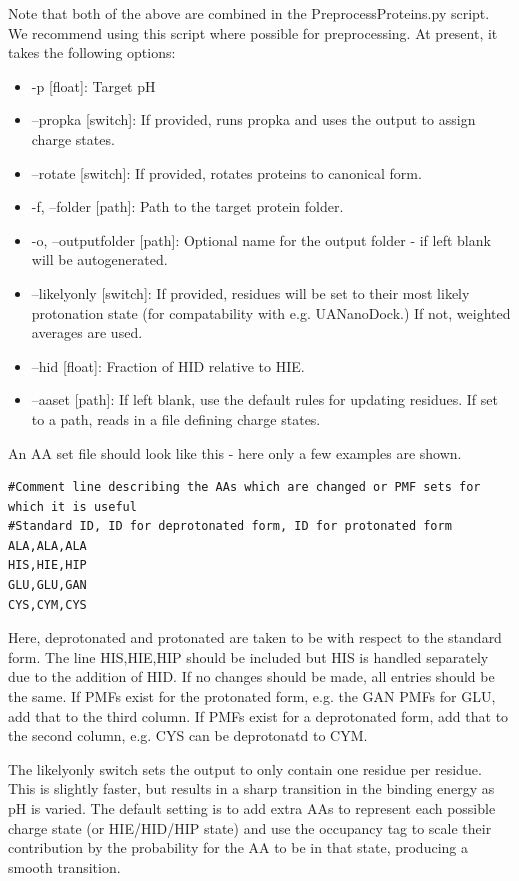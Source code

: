 \documentclass[10pt,a4paper,onecolumn]{report}
\begin{document}
Note that both of the above are combined in the PreprocessProteins.py script. We recommend using this script where possible for preprocessing. At present, it takes the following options:
\begin{itemize}
\item -p [float]: Target pH
\item --propka [switch]: If provided, runs propka and uses the output to assign charge states. 
\item --rotate [switch]: If provided, rotates proteins to canonical form.
\item -f, --folder [path]: Path to the target protein folder.
\item -o, --outputfolder [path]: Optional name for the output folder - if left blank will be autogenerated.
\item --likelyonly [switch]: If provided, residues will be set to their most likely protonation state (for compatability with e.g. UANanoDock.) If not, weighted averages are used.
\item --hid [float]:  Fraction of HID relative to HIE.
\item --aaset [path]: If left blank, use the default rules for updating residues. If set to a path, reads in a file defining charge states. 
\end{itemize}

An AA set file should look like this - here only a few examples are shown.
\begin{lstlisting}
#Comment line describing the AAs which are changed or PMF sets for which it is useful
#Standard ID, ID for deprotonated form, ID for protonated form
ALA,ALA,ALA
HIS,HIE,HIP
GLU,GLU,GAN
CYS,CYM,CYS
\end{lstlisting}
Here, deprotonated and protonated are taken to be with respect to the standard form. The line HIS,HIE,HIP should be included but HIS is handled separately due to the addition of HID. If no changes should be made, all entries should be the same. If PMFs exist for the protonated form, e.g. the GAN PMFs for GLU, add that to the third column. If PMFs exist for a deprotonated form, add that to the second column, e.g. CYS can be deprotonatd to CYM.

The likelyonly switch sets the output to only contain one residue per residue. This is slightly faster, but results in a sharp transition in the binding energy as pH is varied. The default setting is to add extra AAs to represent each possible charge state (or HIE/HID/HIP state) and use the occupancy tag to scale their contribution by the probability for the AA to be in that state, producing a smooth transition.
\end{document}
